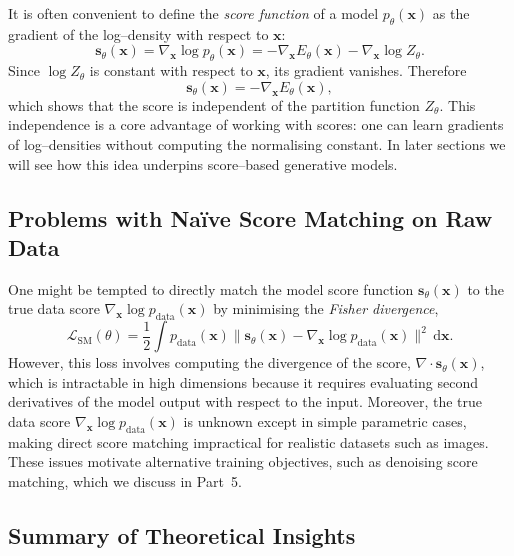 It is often convenient to define the \emph{score function} of a model
$p_\theta(\mathbf{x})$ as the gradient of the log–density with respect to
$\mathbf{x}$:
\begin{equation}
    \mathbf{s}_\theta(\mathbf{x}) = \nabla_{\mathbf{x}} \log p_\theta(\mathbf{x})
    = -\nabla_{\mathbf{x}} E_\theta(\mathbf{x}) - \nabla_{\mathbf{x}} \log
    Z_\theta.
\end{equation}
Since $\log Z_\theta$ is constant with respect to $\mathbf{x}$, its gradient
vanishes.  Therefore
\begin{equation}
    \mathbf{s}_\theta(\mathbf{x}) = -\nabla_{\mathbf{x}} E_\theta(\mathbf{x}),
    \label{eq:score-from-energy}
\end{equation}
which shows that the score is independent of the partition function
$Z_\theta$.  This independence is a core advantage of working with scores:
one can learn gradients of log–densities without computing the normalising
constant.  In later sections we will see how this idea underpins
score–based generative models.

\subsection{Problems with Naïve Score Matching on Raw Data}

One might be tempted to directly match the model score function
$\mathbf{s}_\theta(\mathbf{x})$ to the true data score $\nabla_{\mathbf{x}} \log
p_{\text{data}}(\mathbf{x})$ by minimising the \emph{Fisher divergence},
\begin{equation}
    \mathcal{L}_{\text{SM}}(\theta) = \frac{1}{2}
    \int p_{\text{data}}(\mathbf{x}) \big\| \mathbf{s}_\theta(\mathbf{x}) -
    \nabla_{\mathbf{x}} \log p_{\text{data}}(\mathbf{x}) \big\|^2 \,
    \mathrm{d}\mathbf{x}.
\end{equation}
However, this loss involves computing the divergence of the score,
$\nabla\cdot\mathbf{s}_\theta(\mathbf{x})$, which is intractable in high
dimensions because it requires evaluating second derivatives of the model
output with respect to the input.  Moreover, the true data score
$\nabla_{\mathbf{x}} \log p_{\text{data}}(\mathbf{x})$ is unknown except in
simple parametric cases, making direct score matching impractical for
realistic datasets such as images.  These issues motivate alternative
training objectives, such as denoising score matching, which we discuss in
Part~5.

\subsection{Summary of Theoretical Insights}

